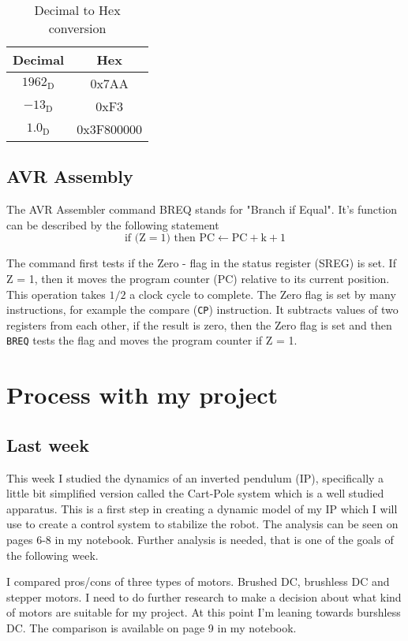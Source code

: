 \documentclass[11pt,a4paper,titlepage]{article}
\begin{document}
\begin{table}[h]
	\centering
	\begin{tabular}{cc}
		\toprule
		Decimal	&	Hex\\
		\midrule
		$1962_\text{D}$	&	0x7AA\\
		$-13_\text{D}$	&	0xF3\\
		$1.0_\text{D}$	&	0x3F800000\\
		\bottomrule
	\end{tabular}
	\caption{Decimal to Hex conversion}
	\label{tab:conversion}
\end{table}

\subsection{AVR Assembly}

The AVR Assembler command BREQ stands for "Branch if Equal". It's function can be described by the following statement
\begin{equation}
	\text{if (}\text{Z} = 1) \text{ then PC} \leftarrow \text{PC}+\text{k}+1
\end{equation}

\noindent The command first tests if the Zero - flag in the status register (SREG) is set. If Z = 1, then it moves the program counter (PC) relative to its current position. This operation takes \(1/2\) a clock cycle to complete.
The Zero flag is set by many instructions, for example the compare (\verb|CP|) instruction. It subtracts values of two registers from each other, if the result is zero, then the Zero flag is set and then \verb|BREQ| tests the flag and moves the program counter if Z = 1.

\section{Process with my project}
\subsection{Last week}
This week I studied the dynamics of an inverted pendulum (IP), specifically a little bit simplified version called the Cart-Pole system which is a well studied apparatus. This is a first step in creating a dynamic model of my IP which I will use to create a control system to stabilize the robot. The analysis can be seen on pages 6-8 in my notebook. Further analysis is needed, that is one of the goals of the following week.

I compared pros/cons of three types of motors. Brushed DC, brushless DC and stepper motors. I need to do further research to make a decision about what kind of motors are suitable for my project. At this point I'm leaning towards burshless DC. The comparison is available on page 9 in my notebook.
\end{document}
